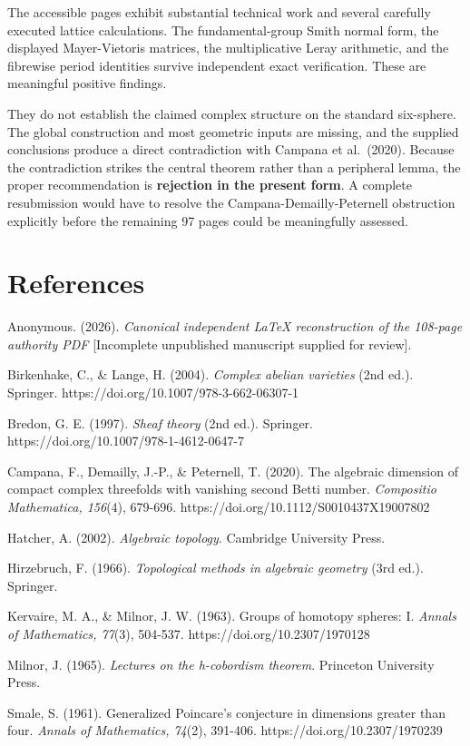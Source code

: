 \documentclass[
  10pt,
]{article}
\begin{document}
The accessible pages exhibit substantial technical work and several
carefully executed lattice calculations. The fundamental-group Smith
normal form, the displayed Mayer-Vietoris matrices, the multiplicative
Leray arithmetic, and the fibrewise period identities survive
independent exact verification. These are meaningful positive findings.

They do not establish the claimed complex structure on the standard
six-sphere. The global construction and most geometric inputs are
missing, and the supplied conclusions produce a direct contradiction
with Campana et al.~(2020). Because the contradiction strikes the
central theorem rather than a peripheral lemma, the proper
recommendation is \textbf{rejection in the present form}. A complete
resubmission would have to resolve the Campana-Demailly-Peternell
obstruction explicitly before the remaining 97 pages could be
meaningfully assessed.

\section{References}\label{references}

Anonymous. (2026). \emph{Canonical independent LaTeX reconstruction of
the 108-page authority PDF} {[}Incomplete unpublished manuscript
supplied for review{]}.

Birkenhake, C., \& Lange, H. (2004). \emph{Complex abelian varieties}
(2nd ed.). Springer. https://doi.org/10.1007/978-3-662-06307-1

Bredon, G. E. (1997). \emph{Sheaf theory} (2nd ed.). Springer.
https://doi.org/10.1007/978-1-4612-0647-7

Campana, F., Demailly, J.-P., \& Peternell, T. (2020). The algebraic
dimension of compact complex threefolds with vanishing second Betti
number. \emph{Compositio Mathematica, 156}(4), 679-696.
https://doi.org/10.1112/S0010437X19007802

Hatcher, A. (2002). \emph{Algebraic topology}. Cambridge University
Press.

Hirzebruch, F. (1966). \emph{Topological methods in algebraic geometry}
(3rd ed.). Springer.

Kervaire, M. A., \& Milnor, J. W. (1963). Groups of homotopy spheres: I.
\emph{Annals of Mathematics, 77}(3), 504-537.
https://doi.org/10.2307/1970128

Milnor, J. (1965). \emph{Lectures on the h-cobordism theorem}. Princeton
University Press.

Smale, S. (1961). Generalized Poincare's conjecture in dimensions
greater than four. \emph{Annals of Mathematics, 74}(2), 391-406.
https://doi.org/10.2307/1970239
\end{document}
